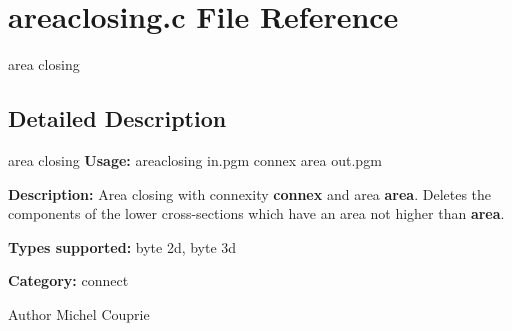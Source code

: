 \section{areaclosing.c File Reference}
\label{areaclosing_8c}


area closing  




\subsection{Detailed Description}
area closing {\bfseries Usage:} areaclosing in.pgm connex area out.pgm

{\bfseries Description:} Area closing with connexity {\bfseries connex} and area {\bfseries area}. Deletes the components of the lower cross-\/sections which have an area not higher than {\bfseries area}.

{\bfseries Types supported:} byte 2d, byte 3d

{\bfseries Category:} connect

\begin{DoxyAuthor}{Author}
Michel Couprie 
\end{DoxyAuthor}
